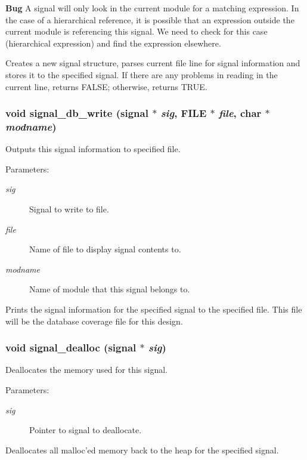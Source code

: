 \begin{Desc}
\item[{\bf Bug}]A signal will only look in the current module for a matching expression. In the case of a hierarchical reference, it is possible that an expression outside the current module is referencing this signal. We need to check for this case (hierarchical expression) and find the expression elsewhere. \end{Desc}
Creates a new signal structure, parses current file line for signal information and stores it to the specified signal. If there are any problems in reading in the current line, returns FALSE; otherwise, returns TRUE. 
\subsubsection{\setlength{\rightskip}{0pt plus 5cm}void signal\_\-db\_\-write ({\bf signal} $\ast$ {\em sig}, FILE $\ast$ {\em file}, char $\ast$ {\em modname})}\label{signal_8c_a4}


Outputs this signal information to specified file. 

\begin{Desc}
\item[Parameters:]
\begin{description}
\item[{\em sig}]Signal to write to file. \item[{\em file}]Name of file to display signal contents to. \item[{\em modname}]Name of module that this signal belongs to.\end{description}
\end{Desc}
Prints the signal information for the specified signal to the specified file. This file will be the database coverage file for this design. 
\subsubsection{\setlength{\rightskip}{0pt plus 5cm}void signal\_\-dealloc ({\bf signal} $\ast$ {\em sig})}\label{signal_8c_a12}


Deallocates the memory used for this signal. 

\begin{Desc}
\item[Parameters:]
\begin{description}
\item[{\em sig}]Pointer to signal to deallocate.\end{description}
\end{Desc}
Deallocates all malloc'ed memory back to the heap for the specified signal. 
